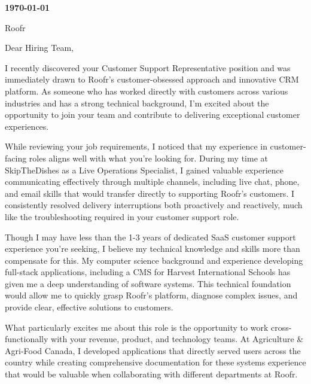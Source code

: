 \documentclass{article}
\begin{document}
    \pagestyle{empty}
    \doublespacing

    

    \noindent
    \textbf{\today}

    \noindent
    Roofr

    \noindent
    Dear Hiring Team,

    \vspace{1em}

    \noindent
    I recently discovered your Customer Support Representative position and was immediately drawn to Roofr's customer-obsessed approach and innovative CRM platform. As someone who has worked directly with customers across various industries and has a strong technical background, I'm excited about the opportunity to join your team and contribute to delivering exceptional customer experiences.


    \vspace{1em}

    \noindent
    While reviewing your job requirements, I noticed that my experience in customer-facing roles aligns well with what you're looking for. During my time at SkipTheDishes as a Live Operations Specialist, I gained valuable experience communicating effectively through multiple channels, including live chat, phone, and email skills that would transfer directly to supporting Roofr's customers. I consistently resolved delivery interruptions both proactively and reactively, much like the troubleshooting required in your customer support role.


    \vspace{1em}

    \noindent
    Though I may have less than the 1-3 years of dedicated SaaS customer support experience you're seeking, I believe my technical knowledge and skills more than compensate for this. My computer science background and experience developing full-stack applications, including a CMS for Harvest International Schools has given me a deep understanding of software systems. This technical foundation would allow me to quickly grasp Roofr's platform, diagnose complex issues, and provide clear, effective solutions to customers.


    \vspace{1em}

    \noindent
    What particularly excites me about this role is the opportunity to work cross-functionally with your revenue, product, and technology teams. At Agriculture \& Agri-Food Canada, I developed applications that directly served users across the country while creating comprehensive documentation for these systems experience that would be valuable when collaborating with different departments at Roofr.
\end{document}
